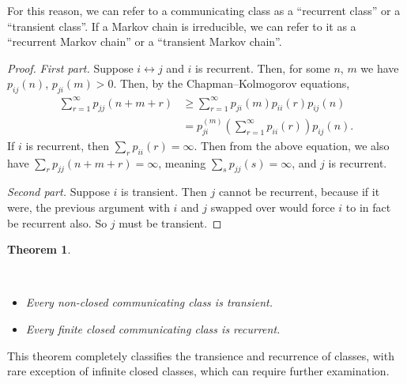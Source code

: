 \documentclass[
  a4paper,
]{article}
\providecommand{\tightlist}{%
  \setlength{\itemsep}{0pt}\setlength{\parskip}{0pt}}
\newtheorem{theorem}{Theorem}[section]
\theoremstyle{definition}
\theoremstyle{definition}
\theoremstyle{definition}
\theoremstyle{remark}
\begin{document}
For this reason, we can refer to a communicating class as a ``recurrent class'' or a ``transient class''. If a Markov chain is irreducible, we can refer to it as a ``recurrent Markov chain'' or a ``transient Markov chain''.

\begin{proof}

\emph{First part.} Suppose \(i \leftrightarrow j\) and \(i\) is recurrent. Then, for some \(n\), \(m\) we have \(p_{ij}(n)\), \(p_{ji}(m) > 0\). Then, by the Chapman--Kolmogorov equations,
\begin{align*}
\sum_{r=1}^\infty p_{jj}(n+m+r)
&\geq \sum_{r=1}^\infty p_{ji}(m)p_{ii}(r) p_{ij}(n) \\
&= p_{ji}^{(m)} \left(\sum_{r=1}^\infty p_{ii}(r) \right) p_{ij}(n) .
\end{align*}
If \(i\) is recurrent, then \(\sum_r p_{ii}(r) = \infty\). Then from the above equation, we also have \(\sum_r p_{jj}(n+m+r) = \infty\), meaning \(\sum_s p_{jj}(s) = \infty\), and \(j\) is recurrent.

\emph{Second part.} Suppose \(i\) is transient. Then \(j\) cannot be recurrent, because if it were, the previous argument with \(i\) and \(j\) swapped over would force \(i\) to in fact be recurrent also. So \(j\) must be transient.

\end{proof}

\begin{theorem}
\protect\hypertarget{thm:unlabeled-div-7}{}\label{thm:unlabeled-div-7}

~

\begin{itemize}
\tightlist
\item
  Every non-closed communicating class is transient.
\item
  Every finite closed communicating class is recurrent.
\end{itemize}

\end{theorem}

This theorem completely classifies the transience and recurrence of classes, with rare exception of infinite closed classes, which can require further examination.
\end{document}
